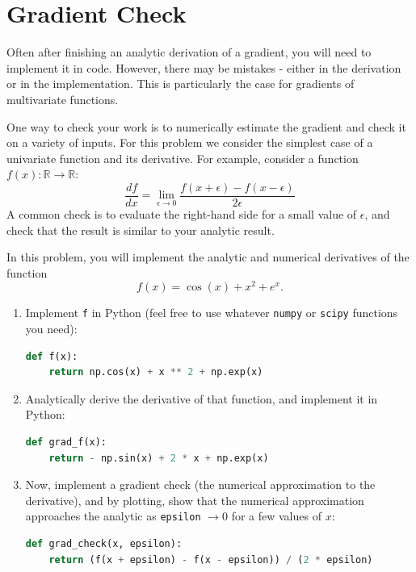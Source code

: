 \documentclass[submit]{harvardml}
\begin{document}
\newpage
\section*{Gradient Check}
\begin{problem}
  Often after finishing an analytic derivation of a gradient, you will
  need to implement it in code.  However, there may be mistakes -
  either in the derivation or in the implementation. This is
  particularly the case for gradients of multivariate functions.

  \air

  \noindent One way to check your work is to numerically estimate the gradient
  and check it on a variety of inputs. For this problem we consider
  the simplest case of a univariate function and its derivative.  For
  example, consider a function $f(x): \mathbb{R} \to \mathbb{R}$:
$$\frac{d f}{d x} = \underset{\epsilon \to 0} \lim \frac{f(x + \epsilon) - f(x - \epsilon)}{2 \epsilon}$$
\noindent A common check is to evaluate the right-hand side for a small value of
$\epsilon$, and check that the result is similar to your analytic
result.\\

\smallskip

\noindent In this problem, you will implement the analytic and numerical derivatives of the function \[f(x) = \cos(x) + x^2 + e^x.\]

\begin{enumerate}
  \item Implement \texttt{f} in Python (feel free to use whatever \texttt{numpy} or \texttt{scipy} functions you need):
  \begin{lstlisting}[language=python]
  def f(x):
  	return np.cos(x) + x ** 2 + np.exp(x)

  \end{lstlisting}
  \item Analytically derive the derivative of that function, and implement it in Python:
  \begin{lstlisting}[language=python]
  def grad_f(x):
  	return - np.sin(x) + 2 * x + np.exp(x)

  \end{lstlisting}
  \item Now, implement a gradient check (the numerical approximation to the derivative), and by plotting, 
        show that the numerical approximation approaches the analytic as \texttt{epsilon} 
        $\to 0$ for a few values of $x$:
  \begin{lstlisting}[language=python]
  def grad_check(x, epsilon):
  	return (f(x + epsilon) - f(x - epsilon)) / (2 * epsilon)
	
  \end{lstlisting}
\end{enumerate}
\end{problem}
\end{document}
